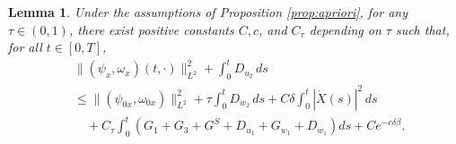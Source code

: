 \documentclass[11pt,reqno]{amsart}
\newtheorem{lemma}{Lemma}[section]
\numberwithin{equation}{section} %
\begin{document}


\begin{lemma}\label{lem:higher2}
	Under the assumptions of Proposition \ref{prop:apriori}, for any $\tau \in (0,1)$, there exist positive constants $C, c$, and $C_\tau$ depending on $\tau$ such that, for all $t \in [0,T]$,
	\begin{equation} \label{est-higher-2}
		\begin{aligned}
			&\|(\psi_x, \omega_x)(t,\cdot)\|_{L^2}^2 + \int_0^t D_{u_2} \,ds \\
			&\le  \|(\psi_{0x}, \omega_{0x})\|_{L^2}^2 + \tau \int_0^t D_{w_2} \,ds + C\delta \int_0^t |\dot{X}(s)|^2 \,ds \\
			&\quad + C_\tau \int_0^t \left(G_1 + G_3 + G^S+ D_{u_1} + G_{w_1} + D_{w_1}   \right) ds + C e^{-c\delta \beta}.
		\end{aligned}
	\end{equation}
\end{lemma}
\end{document}
